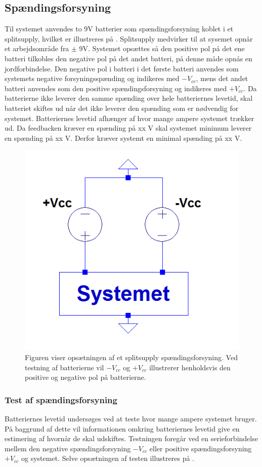 \subsection{Spændingsforsyning}
Til systemet anvendes to 9V batterier som spændingsforsyning koblet i et splitsupply, hvilket er illustreres på . Splitsupply medvirker til at sysemet opnår et arbejdsområde fra $\pm$ 9V. Systemet opsættes så den positive pol på det ene batteri tilkobles den negative pol på det andet batteri, på denne måde opnås en jordforbindelse. Den negative pol i batteri i det første batteri anvendes som systemets negative forsyningsspænding og indikeres med $-V_{cc}$, mens det andet batteri anvendes som den positive spændingsforsyning og indikeres med $+V_{cc}$.
Da batterierne ikke leverer den samme spænding over hele batteriernes levetid, skal batteriet skiftes ud når det ikke leverer den spænding som er nødvendig for systemet. Batteriernes levetid afhænger af hvor mange ampere systemet trækker ud. Da feedbacken kræver en spænding på xx V skal systemet minimum leverer en spænding på xx V. Derfor kræver systemt en minimal spænding på xx V.

\begin{figure}[H]
\centering
\includegraphics[scale=0.5]{figures/cProblemloesning/Splitsupply.PNG}
\caption{Figuren viser opsætningen af et splitsupply spændingsforsyning. Ved testning af batterierne vil $-V_{cc}$ og $+V_{cc}$ illustrerer henholdsvis den positive og negative pol på batterierne.}
\label{fig:splitsupply}
\end{figure}

\subsubsection{Test af spændingsforsyning}
Batteriernes levetid undersøges ved at teste hvor mange ampere systemet bruger. På baggrund af dette vil informationen omkring batteriernes levetid give en estimering af hvornår de skal udskiftes. Testningen foregår ved en serieforbindelse mellem den negative spændingsforsyning $-V_{cc}$ eller positive spændingsforsyning $+V_{cc}$ og systemet. Selve opsætningen af testen illustreres på .
